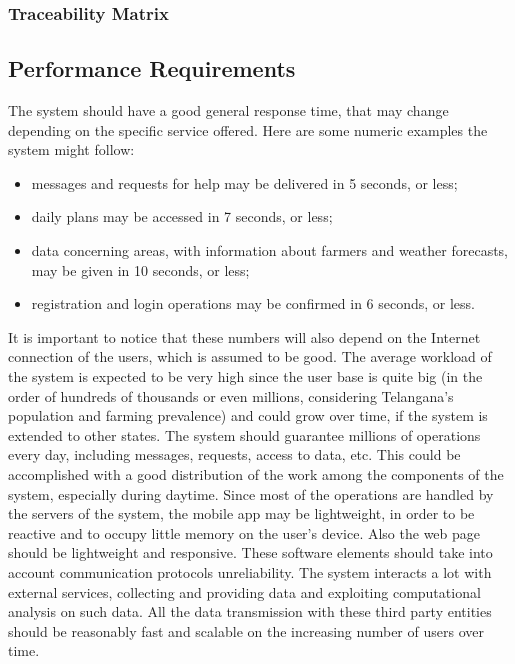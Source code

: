 \subsubsection{Traceability Matrix}

\subsection{Performance Requirements}

The system should have a good general response time, that may change depending on the specific service offered. Here are some numeric examples the system might follow:
\begin{itemize}
    \item messages and requests for help may be delivered in 5 seconds, or less;
    \item daily plans may be accessed in 7 seconds, or less;
    \item data concerning areas, with information about farmers and weather forecasts, may be given in 10 seconds, or less;
    \item registration and login operations may be confirmed in 6 seconds, or less.
\end{itemize}
It is important to notice that these numbers will also depend on the Internet connection of the users, which is assumed to be good.
\newline
\newline
The average workload of the system is expected to be very high since the user base is quite big (in the order of hundreds of thousands or even millions, considering Telangana’s population and farming prevalence) and could grow over time, if the system is extended to other states. The system should guarantee millions of operations every day, including messages, requests, access to data, etc. This could be accomplished with a good distribution of the work among the components of the system, especially during daytime. 
\newline
\newline
Since most of the operations are handled by the servers of the system, the mobile app may be lightweight, in order to be reactive and to occupy little memory on the user’s device. Also the web page should be lightweight and responsive. These software elements should take into account communication protocols unreliability.
\newline
\newline
The system interacts a lot with external services, collecting and providing data and exploiting computational analysis on such data. All the data transmission with these third party entities should be reasonably fast and scalable on the increasing number of users over time.


